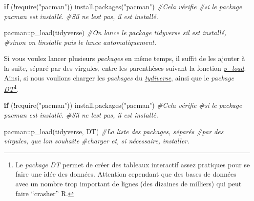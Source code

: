 \documentclass[
]{book}
\newenvironment{Shaded}{\begin{snugshade}}{\end{snugshade}}
\newcommand{\CommentTok}[1]{\textcolor[rgb]{0.56,0.35,0.01}{\textit{#1}}}
\newcommand{\ControlFlowTok}[1]{\textcolor[rgb]{0.13,0.29,0.53}{\textbf{#1}}}
\newcommand{\FunctionTok}[1]{\textcolor[rgb]{0.00,0.00,0.00}{#1}}
\newcommand{\NormalTok}[1]{#1}
\newcommand{\SpecialCharTok}[1]{\textcolor[rgb]{0.00,0.00,0.00}{#1}}
\newcommand{\StringTok}[1]{\textcolor[rgb]{0.31,0.60,0.02}{#1}}
\begin{document}
\begin{Shaded}
\begin{Highlighting}[]
\ControlFlowTok{if}\NormalTok{ (}\SpecialCharTok{!}\FunctionTok{require}\NormalTok{(}\StringTok{"pacman"}\NormalTok{)) }\FunctionTok{install.packages}\NormalTok{(}\StringTok{"pacman"}\NormalTok{) }\CommentTok{\#Cela vérifie}
                             \CommentTok{\#si le package pacman est installé.}
                             \CommentTok{\#S\textquotesingle{}il ne l\textquotesingle{}est pas, il est installé.}

\NormalTok{pacman}\SpecialCharTok{::}\FunctionTok{p\_load}\NormalTok{(tidyverse) }\CommentTok{\#On lance le package tidyverse s\textquotesingle{}il est installé,}
                          \CommentTok{\#sinon on l\textquotesingle{}installe puis le lance automatiquement.}
\end{Highlighting}
\end{Shaded}

Si vous voulez lancer plusieurs \emph{packages} en même temps, il suffit de les ajouter à la suite, séparé par des virgules, entre les parenthèses suivant la fonction \href{https://www.rdocumentation.org/packages/pacman/versions/0.5.1/topics/p_load}{\emph{p\_load}}. Ainsi, si nous voulions charger les \emph{packages} du \href{https://www.tidyverse.org/}{\emph{tydiverse}}, ainsi que le \emph{package} \href{https://rstudio.github.io/DT/}{\emph{DT}}\footnote{Le \emph{package} \emph{DT} permet de créer des tableaux interactif assez pratiques pour se faire une idée des données. Attention cependant que des bases de données avec un nombre trop important de lignes (des dizaines de milliers) qui peut faire ``crasher'' R.}.

\begin{Shaded}
\begin{Highlighting}[]
\ControlFlowTok{if}\NormalTok{ (}\SpecialCharTok{!}\FunctionTok{require}\NormalTok{(}\StringTok{"pacman"}\NormalTok{)) }\FunctionTok{install.packages}\NormalTok{(}\StringTok{"pacman"}\NormalTok{) }\CommentTok{\#Cela vérifie}
                             \CommentTok{\#si le package pacman est installé.}
                             \CommentTok{\#S\textquotesingle{}il ne l\textquotesingle{}est pas, il est installé.}

\NormalTok{pacman}\SpecialCharTok{::}\FunctionTok{p\_load}\NormalTok{(tidyverse, DT) }\CommentTok{\#La liste des packages, séparés}
                      \CommentTok{\#par des virgules, que l\textquotesingle{}on souhaite}
                      \CommentTok{\#charger et, si nécessaire, installer.}
\end{Highlighting}
\end{Shaded}
\end{document}
